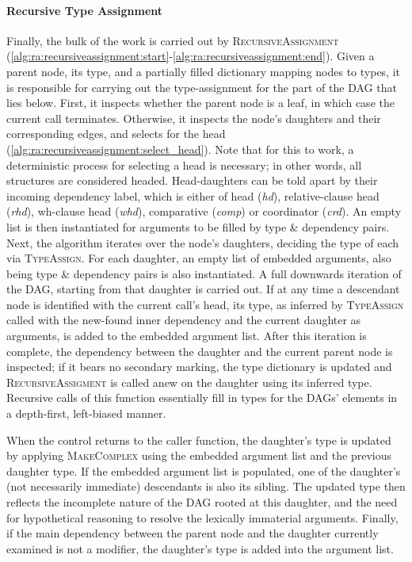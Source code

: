 \paragraph{Recursive Type Assignment}
Finally, the bulk of the work is carried out by \textsc{RecursiveAssignment} (\ref{alg:ra:recursiveassignment:start}-\ref{alg:ra:recursiveassignment:end}).
Given a parent node, its type, and a partially filled dictionary mapping nodes to types, it is responsible for carrying out the type-assignment for the part of the DAG that lies below.
First, it inspects whether the parent node is a leaf, in which case the current call terminates.
Otherwise, it inspects the node's daughters and their corresponding edges, and selects for the head (\ref{alg:ra:recursiveassignment:select_head}). 
Note that for this to work, a deterministic process for selecting a head is necessary; in other words, all structures are considered headed. 
Head-daughters can be told apart by their incoming dependency label, which is either of head (\textit{hd}), relative-clause head (\textit{rhd}), wh-clause head (\textit{whd}), comparative (\textit{comp}) or coordinator (\textit{crd}).
An empty list is then instantiated for arguments to be filled by type \& dependency pairs.
Next, the algorithm iterates over the node's daughters, deciding the type of each via \textsc{TypeAssign}.
For each daughter, an empty list of embedded arguments, also being type \& dependency pairs is also instantiated.
A full downwards iteration of the DAG, starting from that daughter is carried out.
If at any time a descendant node is identified with the current call's head, its type, as inferred by \textsc{TypeAssign} called with the new-found inner dependency and the current daughter as arguments, is added to the embedded argument list.
After this iteration is complete, the dependency between the daughter and the current parent node is inspected; if it bears no secondary marking, the type dictionary is updated and \textsc{RecursiveAssigment} is called anew on the daughter using its inferred type.
Recursive calls of this function essentially fill in types for the DAGs' elements in a depth-first, left-biased manner.

When the control returns to the caller function, the daughter's type is updated by applying \textsc{MakeComplex} using the embedded argument list and the previous daughter type.
If the embedded argument list is populated, one of the daughter's (not necessarily immediate) descendants is also its sibling.
The updated type then reflects the incomplete nature of the DAG rooted at this daughter, and the need for hypothetical reasoning to resolve the lexically immaterial arguments.
Finally, if the main dependency between the parent node and the daughter currently examined is not a modifier, the daughter's type is added into the argument list.

